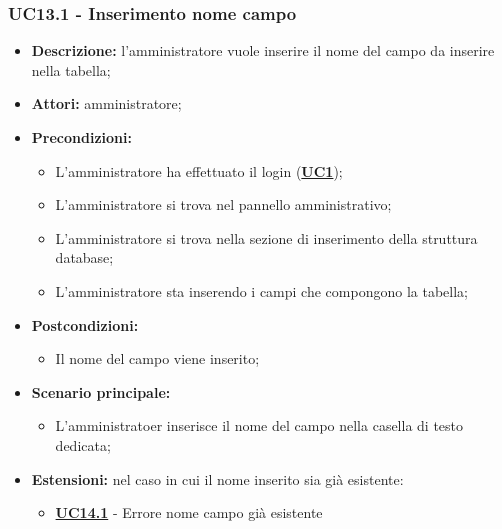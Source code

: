 \documentclass[5pt]{article}
\begin{document}
\subsubsection{UC13.1 - Inserimento nome campo}
\label{sec:UC13.1}
\begin{itemize}
	\item \textbf{Descrizione:} l’amministratore vuole inserire il nome del campo da inserire nella tabella;
	\item \textbf{Attori:} amministratore;
	\item \textbf{Precondizioni:} 
	\begin{itemize}
		\item L’amministratore ha effettuato il login (\hyperref[sec:UC1]{\textbf{UC1}});
		\item L’amministratore si trova nel pannello amministrativo;
		\item L’amministratore si trova nella sezione di inserimento della struttura database;
		\item L’amministratore sta inserendo i campi che compongono la tabella;
	\end{itemize}
	\item \textbf{Postcondizioni:} 
	\begin{itemize}
		\item Il nome del campo viene inserito;
	\end{itemize}
	\item \textbf{Scenario principale:} 
	\begin{itemize}
		\item L’amministratoer inserisce il nome del campo nella casella di testo dedicata;
	\end{itemize}
	\item \textbf{Estensioni:} nel caso in cui il nome inserito sia già esistente:
	\begin{itemize}
		\item \hyperref[sec:UC14.1]{\textbf{UC14.1}} - Errore nome campo già esistente
	\end{itemize}
\end{itemize}
\end{document}
